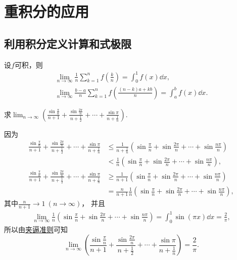 \section{重积分的应用}
\subsection{利用积分定义计算和式极限}
设\(f\)可积，则\begin{gather*}
	\lim_{n\to\infty} \frac1n \sum_{k=1}^n f\left( \frac{k}{n} \right)
	= \int_0^1 f(x) \dd{x}, \\
	\lim_{n\to\infty} \frac{b-a}{n} \sum_{k=1}^n f\left( \frac{(n-k)a+kb}{n} \right)
	= \int_a^b f(x) \dd{x}.
\end{gather*}

\begin{example}
求\(\lim_{n\to\infty} \left( \frac{\sin\frac{\pi}{n}}{n+1} + \frac{\sin\frac{2\pi}{n}}{n+\frac12} + \dotsb + \frac{\sin\pi}{n+\frac1n} \right)\).
\begin{solution}
因为\begin{align*}
	\frac{\sin\frac{\pi}{n}}{n+1} + \frac{\sin\frac{2\pi}{n}}{n+\frac12} + \dotsb + \frac{\sin\pi}{n+\frac1n}
	&\leq \frac1{n+\frac1n} \left( \sin\frac{\pi}{n} + \sin\frac{2\pi}{n} + \dotsb + \sin\frac{n\pi}{n} \right) \\
	&< \frac1n \left( \sin\frac{\pi}{n} + \sin\frac{2\pi}{n} + \dotsb + \sin\frac{n\pi}{n} \right), \\
	\frac{\sin\frac{\pi}{n}}{n+1} + \frac{\sin\frac{2\pi}{n}}{n+\frac12} + \dotsb + \frac{\sin\pi}{n+\frac1n}
	&\geq \frac1{n+1} \left( \sin\frac{\pi}{n} + \sin\frac{2\pi}{n} + \dotsb + \sin\frac{n\pi}{n} \right) \\
	&= \frac{n}{n+1} \frac1n \left( \sin\frac{\pi}{n} + \sin\frac{2\pi}{n} + \dotsb + \sin\frac{n\pi}{n} \right),
\end{align*}
其中\(\frac{n}{n+1} \to 1\ (n\to\infty)\)，
并且\begin{align*}
	\lim_{n\to\infty} \frac1n \left( \sin\frac{\pi}{n} + \sin\frac{2\pi}{n} + \dotsb + \sin\frac{n\pi}{n} \right)
	= \int_0^1 \sin(\pi x) \dd{x} = \frac2\pi,
\end{align*}
所以由\hyperref[theorem:数列极限.夹逼准则]{夹逼准则}可知\begin{equation*}
	\lim_{n\to\infty} \left( \frac{\sin\frac{\pi}{n}}{n+1} + \frac{\sin\frac{2\pi}{n}}{n+\frac12} + \dotsb + \frac{\sin\pi}{n+\frac1n} \right)
	= \frac2\pi.
\end{equation*}
\end{solution}
\end{example}
